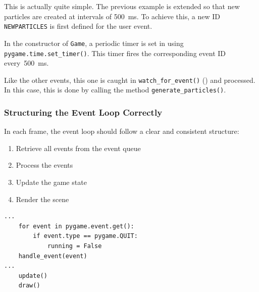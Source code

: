 This is actually quite simple. The previous example is extended so that new particles are created at intervals of \SI{500}{ms}. To achieve this, a new ID \texttt{NEWPARTICLES} is first defined for the user event.


In the constructor of \texttt{Game}, a periodic timer is set in  using \texttt{pygame.time.set\-\_timer()}. This timer fires the corresponding event ID every~\SI{500}{ms}.


Like the other events, this one is caught in \texttt{watch\_for\_event()} () and processed. In this case, this is done by calling the method \texttt{generate\_particles()}.



\subsubsection{Structuring the Event Loop Correctly}

\begin{hintbox}
In each frame, the event loop should follow a clear and consistent structure:
\begin{enumerate}
	\item Retrieve all events from the event queue
	\item Process the events
	\item Update the game state
	\item Render the scene
\end{enumerate}
\end{hintbox}

\lstset{firstnumber=1}
\begin{lstlisting}
...
	for event in pygame.event.get():
		if event.type == pygame.QUIT:
			running = False
	handle_event(event)
...
	update()
	draw()
\end{lstlisting}

